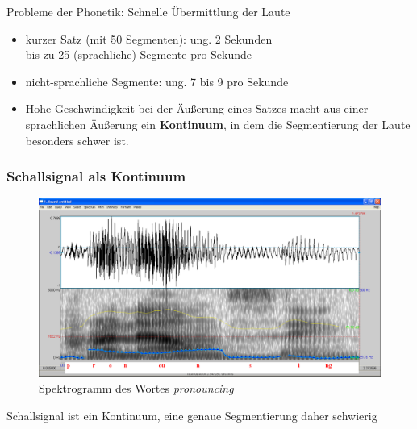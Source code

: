 \begin{frame}{Probleme der Phonetik: Schnelle Übermittlung der Laute}

\begin{itemize}
	\item kurzer Satz (mit 50 Segmenten): ung. 2 Sekunden\\
		\dash bis zu 25 (sprachliche) Segmente pro Sekunde
\medskip
	\item nicht-sprachliche Segmente: ung. 7 bis 9 pro Sekunde
	\item[\ra] Hohe Geschwindigkeit bei der Äußerung eines Satzes macht aus einer sprachlichen Äußerung ein \textbf{Kontinuum}, in dem die Segmentierung der Laute besonders schwer ist.
\end{itemize}


\end{frame}


\begin{frame}
\frametitle{Schallsignal als Kontinuum}

	\begin{figure}[H]
	\centering
	
	\includegraphics[scale=0.2]{material/04Pronouncing}
	\caption{Spektrogramm des Wortes \emph{pronouncing}}
	\end{figure}

Schallsignal ist ein Kontinuum, eine genaue Segmentierung daher schwierig
	
\end{frame}


